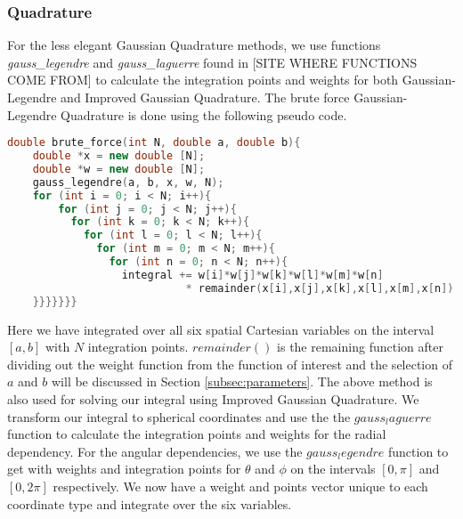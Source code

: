 \documentclass{emulateapj}
\begin{document}
\subsubsection{Quadrature}
For the less elegant Gaussian Quadrature methods, we use functions \textit{gauss\_legendre} and \textit{gauss\_laguerre} found in [SITE WHERE FUNCTIONS COME FROM] to calculate the integration points and weights for both Gaussian-Legendre and Improved Gaussian Quadrature. The brute force Gaussian-Legendre Quadrature is done using the following pseudo code.
\begin{lstlisting}[language=c++]
double brute_force(int N, double a, double b){
    double *x = new double [N];
    double *w = new double [N];
    gauss_legendre(a, b, x, w, N);
    for (int i = 0; i < N; i++){
        for (int j = 0; j < N; j++){
          for (int k = 0; k < N; k++){
            for (int l = 0; l < N; l++){
              for (int m = 0; m < N; m++){
                for (int n = 0; n < N; n++){
                  integral += w[i]*w[j]*w[k]*w[l]*w[m]*w[n]
                            * remainder(x[i],x[j],x[k],x[l],x[m],x[n]);
    }}}}}}}
\end{lstlisting}
Here we have integrated over all six spatial Cartesian variables on the interval $[a,b]$ with $N$ integration points. $remainder()$ is the remaining function after dividing out the weight function from the function of interest and the selection of $a$ and $b$ will be discussed in Section \ref{subsec:parameters}. The above method is also used for solving our integral using Improved Gaussian Quadrature. We transform our integral to spherical coordinates and use the  the $gauss_laguerre$ function to calculate the integration points and weights for the radial dependency. For the angular dependencies, we use the $gauss_legendre$ function to get with weights and integration points for $\theta$ and $\phi$ on the intervals $[0,\pi]$ and $[0,2\pi]$ respectively. We now have a weight and points vector unique to each coordinate type and integrate over the six variables.
\end{document}
